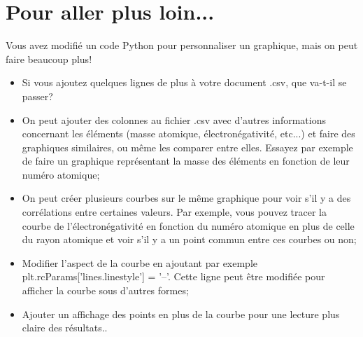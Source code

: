 \section{Pour aller plus loin...}
Vous avez modifié un code Python pour personnaliser un graphique, mais on peut faire beaucoup plus!
\begin{itemize}
\item Si vous ajoutez quelques lignes de plus à votre document .csv, que va-t-il se passer?
\item On peut ajouter des colonnes au fichier .csv avec d'autres informations concernant les éléments (masse atomique, électronégativité, etc...) et faire des graphiques similaires, ou même les comparer entre elles. Essayez par exemple de faire un graphique représentant la masse des éléments en fonction de leur numéro atomique;
\item On peut créer plusieurs courbes sur le même graphique pour voir s'il y a des corrélations entre certaines valeurs. Par exemple, vous pouvez tracer la courbe de l'électronégativité en fonction du numéro atomique en plus de celle du rayon atomique et voir s'il y a un point commun entre ces courbes ou non;
\item Modifier l'aspect de la courbe en ajoutant par exemple {plt.rcParams['lines.linestyle'] = '--'}. Cette ligne peut être modifiée pour afficher la courbe sous d'autres formes;
\item Ajouter un affichage des points en plus de la courbe pour une lecture plus claire des résultats..
\end{itemize}

\vfill



